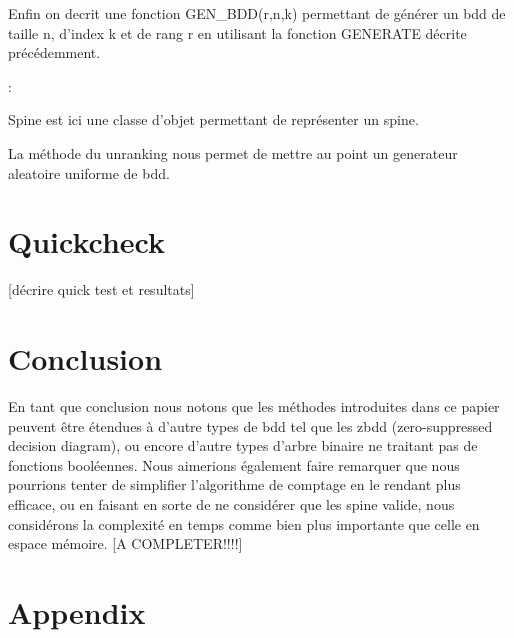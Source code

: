 \documentclass[french]{article}
\begin{document}
\newpage

Enfin on decrit une fonction GEN\_BDD(r,n,k) permettant de générer un bdd de taille n, d'index k et de rang r en utilisant la fonction GENERATE décrite précédemment.

\begin{algorithm}
  \begin{algorithmic}[1]
    \Statex
            \State {}
            \State {}
            \State {}
            \State {}
            \State {}
                \State {}
                :
                    \State {}
                    \State {}
                    \State {}
            \EndFor
  \end{algorithmic}
\end{algorithm}

Spine est ici une classe d'objet permettant de représenter un spine.

La méthode du unranking nous permet de mettre au point un generateur aleatoire uniforme de bdd.

\newpage
\section{Quickcheck}
[décrire quick test et resultats]
\newpage
\section{Conclusion}
En tant que conclusion nous notons que les méthodes introduites dans ce papier peuvent être étendues à d'autre types de bdd tel que les zbdd (zero-suppressed decision diagram), ou encore d'autre types d'arbre binaire ne traitant pas de fonctions booléennes. Nous aimerions également faire remarquer que nous pourrions tenter de simplifier l'algorithme de comptage en le rendant plus efficace, ou en faisant en sorte de ne considérer que les spine valide, nous considérons la complexité en temps comme bien plus importante que celle en espace mémoire.
[A COMPLETER!!!!]
\newpage
\section{Appendix}
\end{document}
